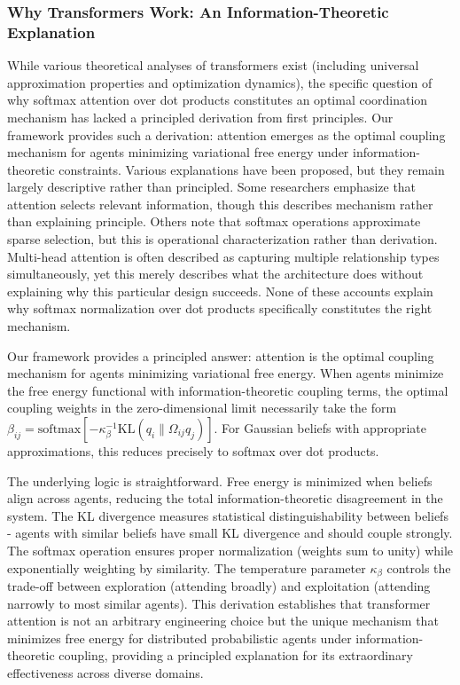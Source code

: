 \documentclass[11pt]{article}
\begin{document}
\subsubsection{Why Transformers Work: An Information-Theoretic Explanation}

While various theoretical analyses of transformers exist (including universal approximation properties and optimization dynamics), the specific question of why softmax attention over dot products constitutes an optimal coordination mechanism has lacked a principled derivation from first principles. Our framework provides such a derivation: attention emerges as the optimal coupling mechanism for agents minimizing variational free energy under information-theoretic constraints. Various explanations have been proposed, but they remain largely descriptive rather than principled. Some researchers emphasize that attention selects relevant information, though this describes mechanism rather than explaining principle. Others note that softmax operations approximate sparse selection, but this is operational characterization rather than derivation. Multi-head attention is often described as capturing multiple relationship types simultaneously, yet this merely describes what the architecture does without explaining why this particular design succeeds. None of these accounts explain why softmax normalization over dot products specifically constitutes the right mechanism.

Our framework provides a principled answer: attention is the optimal coupling mechanism for agents minimizing variational free energy. When agents minimize the free energy functional with information-theoretic coupling terms, the optimal coupling weights in the zero-dimensional limit necessarily take the form $\beta_{ij} = \mathrm{softmax}[-\kappa_\beta^{-1}\mathrm{KL}(q_i \| \Omega_{ij}q_j)]$. For Gaussian beliefs with appropriate approximations, this reduces precisely to softmax over dot products.

The underlying logic is straightforward. Free energy is minimized when beliefs align across agents, reducing the total information-theoretic disagreement in the system. The KL divergence measures statistical distinguishability between beliefs - agents with similar beliefs have small KL divergence and should couple strongly. The softmax operation ensures proper normalization (weights sum to unity) while exponentially weighting by similarity. The temperature parameter $\kappa_\beta$ controls the trade-off between exploration (attending broadly) and exploitation (attending narrowly to most similar agents). This derivation establishes that transformer attention is not an arbitrary engineering choice but the unique mechanism that minimizes free energy for distributed probabilistic agents under information-theoretic coupling, providing a principled explanation for its extraordinary effectiveness across diverse domains.
\end{document}
